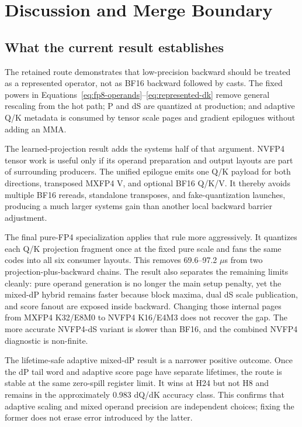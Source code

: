 \section{Discussion and Merge Boundary}

\subsection{What the current result establishes}

The retained route demonstrates that low-precision backward should be treated
as a represented operator, not as BF16 backward followed by casts.  The fixed
powers in Equations~\ref{eq:fp8-operands}--\ref{eq:represented-dk} remove
general rescaling from the hot path; P and dS are quantized at production;
and adaptive Q/K metadata is consumed by tensor scale pages and gradient
epilogues without adding an MMA.

The learned-projection result adds the systems half of that argument.  NVFP4
tensor work is useful only if its operand preparation and output layouts are
part of surrounding producers.  The unified epilogue emits one Q/K payload
for both directions, transposed MXFP4 V, and optional BF16 Q/K/V.  It thereby
avoids multiple BF16 rereads, standalone transposes, and fake-quantization
launches, producing a much larger systems gain than another local backward
barrier adjustment.

The final pure-FP4 specialization applies that rule more aggressively.  It
quantizes each Q/K projection fragment once at the fixed pure scale and fans
the same codes into all six consumer layouts.  This removes 69.6--97.2
$\mu$s from two projection-plus-backward chains.  The result also separates
the remaining limits cleanly: pure operand generation is no longer the main
setup penalty, yet the mixed-dP hybrid remains faster because block maxima,
dual dS scale publication, and score fanout are exposed inside backward.
Changing those internal pages from MXFP4 K32/E8M0 to NVFP4 K16/E4M3 does not
recover the gap.  The more accurate NVFP4-dS variant is slower than BF16, and
the combined NVFP4 diagnostic is non-finite.

The lifetime-safe adaptive mixed-dP result is a narrower positive outcome.
Once the dP tail word and adaptive score page have separate lifetimes, the
route is stable at the same zero-spill register limit.  It wins at H24 but not
H8 and remains in the approximately 0.983 dQ/dK accuracy class.  This confirms
that adaptive scaling and mixed operand precision are independent choices;
fixing the former does not erase error introduced by the latter.

